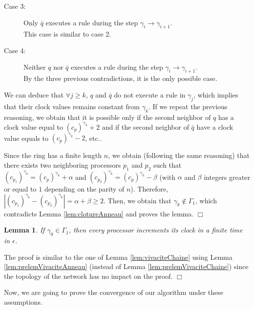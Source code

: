 \documentclass[11pt,english,letterpaper]{article}
\newtheorem{lemma}{Lemma}
\newenvironment{proof}{{\noindent\bf Proof. } }{{\hfill $\Box$}}
\begin{document}
\begin{proof}
\begin{description}
\item[Case 3:] Only $ \bar{q}$ executes a rule during the step $\gamma_{i}\rightarrow\gamma_{i+1}$.\\
This case is similar to case 2.

\item[Case 4:] Neither $q$ nor $\bar{q}$ executes a rule during the step $\gamma_{i}\rightarrow\gamma_{i+1}$.\\
By the three previous contradictions, it is the only possible case.
\end{description}

We can deduce that $\forall j\geq k$, $q$ and $\bar{q}$ do not execute a rule in $\gamma_{j}$, which implies that their clock values remains constant from $\gamma_{k}$. If we repeat the previous reasoning, we obtain that it is possible only if the second neighbor of $q$ has a clock value equal to $\left(c_{p}\right)^{\gamma_{k}}+2$ and if the second neighbor of $\bar{q}$ have a clock value equals to $\left(c_{p}\right)^{\gamma_{k}}-2$, etc..

Since the ring has a finite length $n$, we obtain (following the same reasoning) that there exists two neighboring processors $p_{1}$ and $p_{2}$ such that  $\left(c_{p_{1}}\right)^{\gamma_{k}}=\left(c_{p}\right)^{\gamma_{k}}+\alpha$ and $\left(c_{p_{2}}\right)^{\gamma_{k}}=\left(c_{p}\right)^{\gamma_{k}}-\beta$ (with $\alpha$  and $\beta$ integers greater or equal to $1$ depending on the parity of $n$). Therefore, $|\left(c_{p_{1}}\right)^{\gamma_{k}}-\left(c_{p_{2}}\right)^{\gamma_{k}}|=\alpha+\beta\geq 2$. Then, we obtain that $\gamma_{k}\notin\Gamma_{1}$, which contradicts Lemma \ref{lem:clotureAnneau} and proves the lemma.
\end{proof}

\begin{lemma}\label{lem:vivaciteAnneau}
If $\gamma_{0}\in\Gamma_{1}$, then every processor increments its clock in a finite time in $\epsilon$.
\end{lemma}

\begin{proof}
The proof is similar to the one of Lemma \ref{lem:vivaciteChaine} using Lemma \ref{lem:prelemVivaciteAnneau} (instead of Lemma \ref{lem:prelemVivaciteChaine}) since the topology of the network has no impact on the proof.
\end{proof}
		
Now, we are going to prove the convergence of our algorithm under these assumptions.
\end{document}
